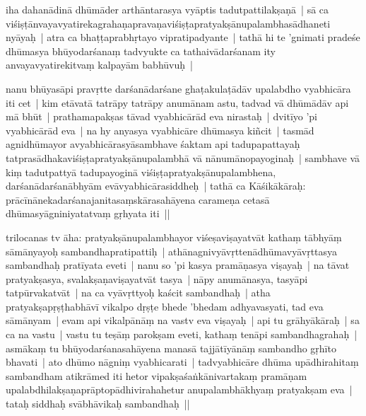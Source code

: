 \documentclass[article,12pt,a4paper]{memoir}%
\newcommand{\persName}[1]{#1}
\newcounter{parCount}
\begin{document}
	  
	  \pstart \leavevmode%
	\label{thakur75-106.4}iha dahanādinā dhūmāder arthāntarasya vyāptis tadutpattilakṣaṇā | sā ca viśiṣṭānvayavyatirekagrahaṇapravaṇaviśiṣṭapratyakṣānupalambhasādhaneti nyāyaḥ | atra ca bhaṭṭaprabhṛtayo vipratipadyante | tathā hi te 'gnimati pradeśe dhūmasya bhūyodarśanaṃ tadvyukte ca tathaivādarśanam ity anvayavyatirekitvaṃ kalpayām babhūvuḥ | 
	{}
	\pend%
      

	  
	  \pstart \leavevmode%
	\label{thakur75-106.8}nanu bhūyasāpi pravṛtte darśanādarśane ghaṭakulaṭādāv upalabdho vyabhicāra iti cet | kim etāvatā tatrāpy tatrāpy anumānam astu, tadvad vā dhūmādāv api mā bhūt | prathamapakṣas tāvad vyabhicārād eva nirastaḥ | dvitīyo 'pi vyabhicārād eva | na hy anyasya vyabhicāre dhūmasya kiñcit | tasmād agnidhūmayor avyabhicārasyāsambhave śaktam api tadupapattayaḥ tatprasādhakaviśiṣṭapratyakṣānupalambhā vā nānumānopayoginaḥ | sambhave vā kiṃ tadutpattyā tadupayoginā viśiṣṭapratyakṣānupalambhena, darśanādarśanābhyām evāvyabhicārasiddheḥ | tathā ca Kāśikākāraḥ: prācīnānekadarśanajanitasaṃskārasahāyena carameṇa cetasā dhūmasyāgniniyatatvaṃ gṛhyata iti ||
	{}
	\pend%
      

	  
	  \pstart \leavevmode%
	\label{thakur75-106.16}\persName{trilocanas} tv āha: pratyakṣānupalambhayor viśeṣaviṣayatvāt kathaṃ tābhyāṃ sāmānyayoḥ sambandhapratipattiḥ | athānagnivyāvṛttenādhūmavyāvṛttasya sambandhaḥ pratīyata eveti | nanu so 'pi kasya pramāṇasya viṣayaḥ | na tāvat pratyakṣasya, svalakṣaṇaviṣayatvāt tasya | nāpy anumānasya, tasyāpi tatpūrvakatvāt | na ca vyāvṛttyoḥ  kaścit sambandhaḥ | atha pratyakṣapṛṣṭhabhāvī vikalpo dṛṣṭe bhede 'bhedam adhyavasyati, tad eva sāmānyam | evam api vikalpānāṃ na vastv eva viṣayaḥ | api tu grāhyākāraḥ | sa ca na vastu | vastu tu teṣāṃ parokṣam eveti, kathaṃ tenāpi sambandhagrahaḥ | asmākaṃ tu bhūyodarśanasahāyena manasā tajjātīyānāṃ sambandho gṛhīto bhavati | ato dhūmo nāgniṃ vyabhicarati | tadvyabhicāre dhūma upādhirahitaṃ sambandham atikrāmed iti hetor vipakṣaśaṅkānivartakaṃ pramāṇam upalabdhilakṣaṇaprāptopādhivirahahetur anupalambhākhyaṃ pratyakṣam eva | tataḥ siddhaḥ svābhāvikaḥ sambandhaḥ ||
	{}
	\pend%
      
\end{document}
